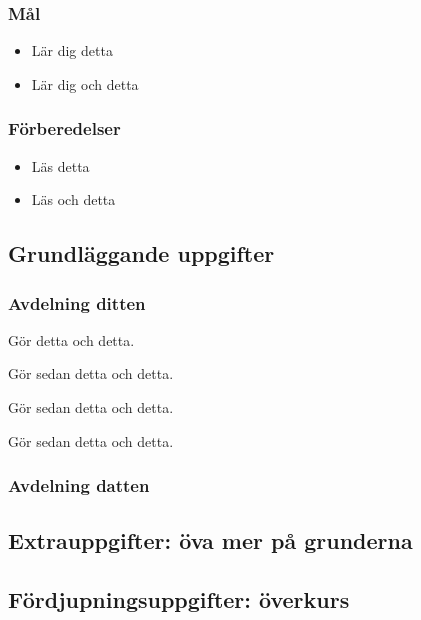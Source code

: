 

\subsubsection{Mål}
\begin{itemize}[nosep]
\item Lär dig detta
\item Lär dig och detta
\end{itemize}

\subsubsection{Förberedelser}
\begin{itemize}[nosep]
\item Läs detta
\item Läs och detta
\end{itemize}

\subsection{Grundläggande uppgifter}

\subsubsection{Avdelning ditten}

\Task Gör detta och detta.

\Task Gör sedan detta och detta. 

\TaskComputer Gör sedan detta och detta. 

\TaskPencil Gör sedan detta och detta.

\subsubsection{Avdelning datten}
\lipsum[7]

\subsection{Extrauppgifter: öva mer på grunderna}
\lipsum[2]


\subsection{Fördjupningsuppgifter: överkurs}
\lipsum[2]
